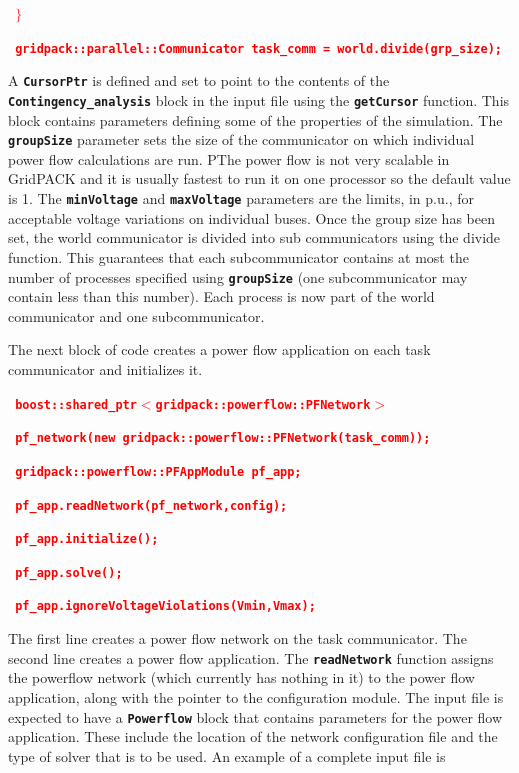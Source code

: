 \documentclass[12pt]{report} %
\begin{document}
\textcolor{red}{\texttt{\textbf{  $\boldsymbol{\mathrm{\}}}$}}}

\textcolor{red}{\texttt{\textbf{  gridpack::parallel::Communicator task\_comm = world.divide(grp\_size);}}}

A \texttt{\textbf{CursorPtr}} is defined and set to point to the contents of the \texttt{\textbf{Contingency\_analysis}} block in the input file using the \texttt{\textbf{getCursor}} function. This block contains parameters defining some of the properties of the simulation. The \texttt{\textbf{groupSize}} parameter sets the size of the communicator on which individual power flow calculations are run. PThe power flow is not very scalable in GridPACK and it is usually fastest to run it on one processor so the default value is 1. The \texttt{\textbf{minVoltage}} and \texttt{\textbf{maxVoltage}} parameters are the limits, in p.u., for acceptable voltage variations on individual buses. Once the group size has been set, the world communicator is divided into sub communicators using the divide function. This guarantees that each subcommunicator contains at most the number of processes specified using \texttt{\textbf{groupSize}} (one subcommunicator may contain less than this number). Each process is now part of the world communicator and one subcommunicator.

The next block of code creates a power flow application on each task communicator and initializes it.

\textcolor{red}{\texttt{\textbf{  boost::shared\_ptr$\boldsymbol{\mathrm{<}}$gridpack::powerflow::PFNetwork$\boldsymbol{\mathrm{>}}$}}}

\textcolor{red}{\texttt{\textbf{    pf\_network(new gridpack::powerflow::PFNetwork(task\_comm));}}}

\textcolor{red}{\texttt{\textbf{  gridpack::powerflow::PFAppModule pf\_app;}}}

\textcolor{red}{\texttt{\textbf{  pf\_app.readNetwork(pf\_network,config);}}}

\textcolor{red}{\texttt{\textbf{  pf\_app.initialize();}}}

\textcolor{red}{\texttt{\textbf{  pf\_app.solve();}}}

\textcolor{red}{\texttt{\textbf{  pf\_app.ignoreVoltageViolations(Vmin,Vmax);}}}

The first line creates a power flow network on the task communicator. The second line creates a power flow application. The \texttt{\textbf{readNetwork}} function assigns the powerflow network (which currently has nothing in it) to the power flow application, along with the pointer to the configuration module. The input file is expected to have a \texttt{\textbf{Powerflow}} block that contains parameters for the  power flow application. These include the location of the network configuration file and the type of solver that is to be used. An example of a complete input file is
\end{document}
